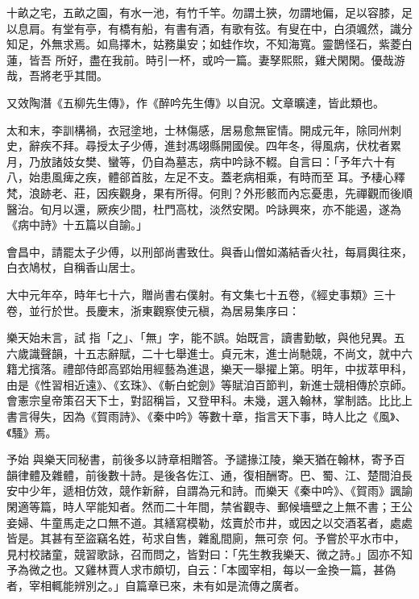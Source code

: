 \begin{pinyinscope}
 十畝之宅，五畝之園，有水一池，有竹千竿。勿謂土狹，勿謂地偏，足以容膝，足以息肩。有堂有亭，有橋有船，有書有酒，有歌有弦。有叟在中，白須颯然，識分知足，外無求焉。如鳥擇木，姑務巢安；如蛙作坎，不知海寬。靈鵲怪石，紫菱白蓮，皆吾
 所好，盡在我前。時引一杯，或吟一篇。妻孥熙熙，雞犬閑閑。優哉游哉，吾將老乎其間。



 又效陶潛《五柳先生傳》，作《醉吟先生傳》以自況。文章曠達，皆此類也。



 太和末，李訓構禍，衣冠塗地，士林傷感，居易愈無宦情。開成元年，除同州刺史，辭疾不拜。尋授太子少傅，進封馮翊縣開國侯。四年冬，得風病，伏枕者累月，乃放諸妓女樊、蠻等，仍自為墓志，病中吟詠不輟。自言曰：「予年六十有八，始患風痺之疾，體郤首胘，左足不支。蓋老病相乘，有時而至
 耳。予棲心釋梵，浪跡老、莊，因疾觀身，果有所得。何則？外形骸而內忘憂患，先禪觀而後順醫治。旬月以還，厥疾少間，杜門高枕，淡然安閑。吟詠興來，亦不能遏，遂為《病中詩》十五篇以自諭。」



 會昌中，請罷太子少傅，以刑部尚書致仕。與香山僧如滿結香火社，每肩輿往來，白衣鳩杖，自稱香山居士。



 大中元年卒，時年七十六，贈尚書右僕射。有文集七十五卷，《經史事類》三十卷，並行於世。長慶末，浙東觀察使元稹，為居易集序曰：



 樂天始未言，試
 指「之」、「無」字，能不誤。始既言，讀書勤敏，與他兒異。五六歲識聲韻，十五志辭賦，二十七舉進士。貞元末，進士尚馳競，不尚文，就中六籍尤擯落。禮部侍郎高郢始用經藝為進退，樂天一舉擢上第。明年，中拔萃甲科，由是《性習相近遠》、《玄珠》、《斬白蛇劍》等賦洎百節判，新進士競相傳於京師。會憲宗皇帝策召天下士，對詔稱旨，又登甲科。未幾，選入翰林，掌制誥。比比上書言得失，因為《賀雨詩》、《秦中吟》等數十章，指言天下事，時人比之《風》、《騷》焉。



 予始
 與樂天同秘書，前後多以詩章相贈答。予譴掾江陵，樂天猶在翰林，寄予百韻律體及雜體，前後數十詩。是後各佐江、通，復相酬寄。巴、蜀、江、楚間洎長安中少年，遞相仿效，競作新辭，自謂為元和詩。而樂天《秦中吟》、《賀雨》諷諭閑適等篇，時人罕能知者。然而二十年間，禁省觀寺、郵候墻壁之上無不書；王公妾婦、牛童馬走之口無不道。其繕寫模勒，炫賣於市井，或因之以交酒茗者，處處皆是。其甚有至盜竊名姓，茍求自售，雜亂間廁，無可奈
 何。予嘗於平水市中，見村校諸童，競習歌詠，召而問之，皆對曰：「先生教我樂天、微之詩。」固亦不知予為微之也。又雞林賈人求市頗切，自云：「本國宰相，每以一金換一篇，甚偽者，宰相輒能辨別之。」自篇章已來，未有如是流傳之廣者。




\end{pinyinscope}
